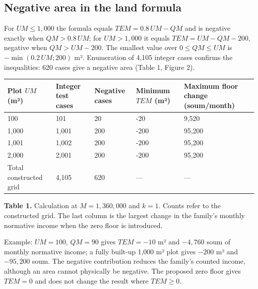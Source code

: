 \documentclass[12pt,a4paper]{extarticle}
\begin{document}
\subsection{Negative area in the land formula}
For $UM\le1{,}000$ the formula equals $TEM=0.8\,UM-QM$ and is negative exactly when $QM>0.8\,UM$; for $UM>1{,}000$ it equals $TEM=UM-QM-200$, negative when $QM>UM-200$. The smallest value over $0\le QM\le UM$ is $-\min(0.2\,UM;200)$ m². Enumeration of 4,105 integer cases confirms the inequalities: 620 cases give a negative area (Table 1, Figure 2).

\begingroup\fontsize{11bp}{13.2bp}\selectfont
\begin{longtable}{p{} p{} p{} p{} p{}}
\toprule
Plot $UM$ (m²) & Integer test cases & Negative cases & Minimum $TEM$ (m²) & Maximum floor change (soum/month) \\
\midrule
\endhead
100 & 101 & 20 & -20 & 9,520 \\
1,000 & 1,001 & 200 & -200 & 95,200 \\
1,001 & 1,002 & 200 & -200 & 95,200 \\
2,000 & 2,001 & 200 & -200 & 95,200 \\
Total constructed grid & 4,105 & 620 & — & — \\
\bottomrule
\end{longtable}
\endgroup
\textbf{Table 1.} Calculation at $M=1{,}360{,}000$ and $k=1$. Counts refer to the constructed grid. The last column is the largest change in the family’s monthly normative income when the zero floor is introduced.

Example: $UM=100$, $QM=90$ gives $TEM=-10$ m² and $-4{,}760$ soum of monthly normative income; a fully built-up 1,000 m² plot gives $-200$ m² and $-95{,}200$ soum. The negative contribution reduces the family’s counted income, although an area cannot physically be negative. The proposed zero floor gives $TEM=0$ and does not change the result where $TEM\ge0$.
\end{document}
